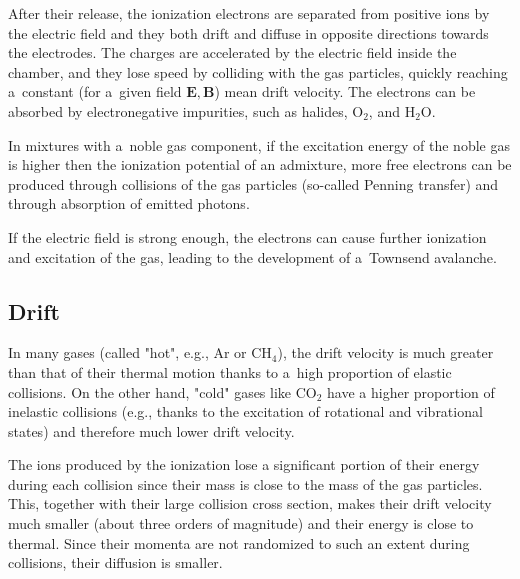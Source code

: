 		After their release, the ionization electrons are separated from positive ions by the electric field and they both drift and diffuse in opposite directions towards the electrodes. The charges are accelerated by the electric field inside the chamber, and they lose speed by colliding with the gas particles, quickly reaching a~constant (for a~given field $\mathbf{E}, \mathbf{B}$) mean drift velocity. The electrons can be absorbed by electronegative impurities, such as halides, O$_2$, and H$_2$O.
		
		In mixtures with a~noble gas component, if the excitation energy of the noble gas is higher then the ionization potential of an admixture, more free electrons can be produced through collisions of the gas particles (so\nobreakdash-called Penning transfer) and through absorption of emitted photons.
		
		If the electric field is strong enough, the electrons can cause further ionization and excitation of the gas, leading to the development of a~Townsend avalanche.
	
		\subsection{Drift}			
			In many gases (called "hot", e.g., Ar or CH$_4$), the drift velocity is much greater than that of their thermal motion thanks to a~high proportion of elastic collisions. On the other hand, "cold" gases like CO$_2$ have a higher proportion of inelastic collisions (e.g., thanks to the excitation of rotational and vibrational states) and therefore much lower drift velocity.
			
			The ions produced by the ionization lose a significant portion of their energy during each collision since their mass is close to the mass of the gas particles. This, together with their large collision cross section, makes their drift velocity much smaller (about three orders of magnitude) and their energy is close to thermal. Since their momenta are not randomized to such an extent during collisions, their diffusion is smaller.
			

